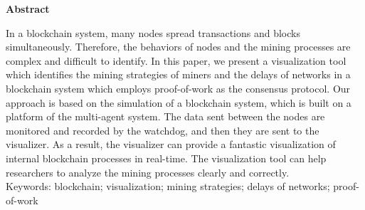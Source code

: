 \thispagestyle{plain}
\vspace*{\fill}
    \begin{center}
        \Large
        \textbf{Abstract}
    \end{center}
    
    \vspace{1cm}
    
    In a blockchain system, many nodes spread transactions and blocks simultaneously. Therefore, the behaviors of nodes and the mining processes are complex and difficult to identify. In this paper, we present a visualization tool which identifies the mining strategies of miners and the delays of networks in a blockchain system which employs proof-of-work as the consensus protocol. Our approach is based on the simulation of a blockchain system, which is built on a platform of the multi-agent system. The data sent between the nodes are monitored and recorded by the watchdog, and then they are sent to the visualizer. As a result, the visualizer can provide a fantastic visualization of internal blockchain processes in real-time. The visualization tool can help researchers to analyze the mining processes clearly and correctly. \\
    
    Keywords: blockchain; visualization; mining strategies; delays of networks; proof-of-work
\vspace*{\fill}

